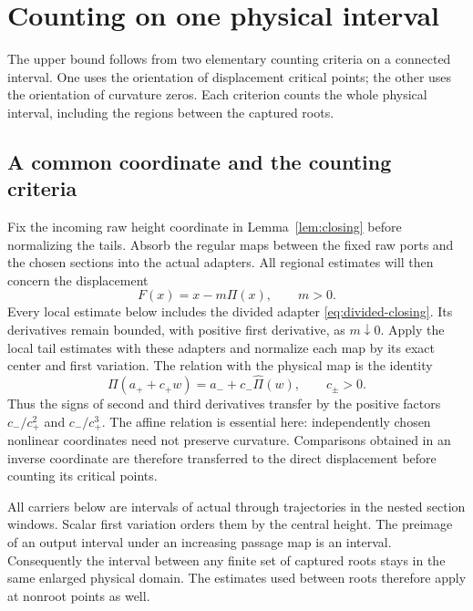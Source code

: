 \section{Counting on one physical interval}
\label{sec:counting-tools}

The upper bound follows from two elementary counting criteria on a
connected interval. One uses the orientation of displacement critical
points; the other uses the orientation of curvature zeros. Each criterion
counts the whole physical interval, including the regions between the
captured roots.

\subsection{A common coordinate and the counting criteria}

Fix the incoming raw height coordinate in Lemma~\ref{lem:closing} before
normalizing the tails. Absorb the regular maps between the fixed raw ports
and the chosen sections into the actual adapters. All regional estimates
will then concern the displacement
\begin{equation}\label{sharp:upper-displacement}
 F(x)=x-m\Pi(x),\qquad m>0.
\end{equation}
Every local estimate below includes the divided adapter
\eqref{eq:divided-closing}. Its derivatives remain bounded, with positive
first derivative, as \(m\downarrow0\). Apply the local tail estimates
with these adapters and normalize each map by its exact center and first
variation. The relation with the physical map is the identity
\begin{equation}\label{sharp:upper-affine}
 \Pi(a_++c_+w)=a_-+c_-\widehat\Pi(w),\qquad c_\pm>0.
\end{equation}
Thus the signs of second and third derivatives transfer by the positive
factors \(c_-/c_+^2\) and \(c_-/c_+^3\). The affine relation is
essential here: independently chosen nonlinear coordinates need not
preserve curvature. Comparisons obtained in an inverse coordinate are
therefore transferred to the direct displacement before counting its
critical points.

All carriers below are intervals of actual through trajectories in the
nested section windows. Scalar first variation orders them by the central
height. The preimage of an output interval under an increasing passage map
is an interval. Consequently the interval between any finite set of
captured roots stays in the same enlarged physical domain. The estimates
used between roots therefore apply at nonroot points as well.

